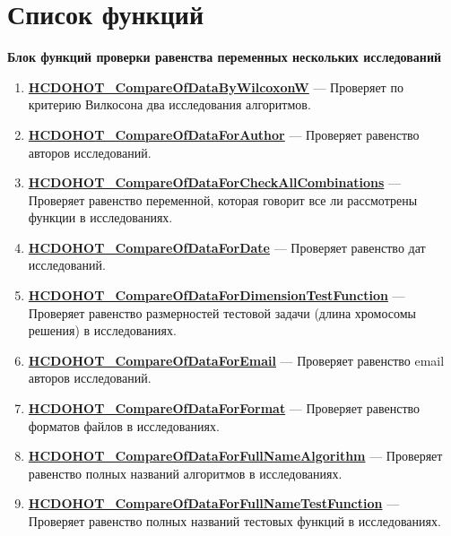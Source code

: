 \documentclass[a4paper,12pt]{article}
\begin{document}
\section{Список функций}\label{section_listfunctions}
\textbf{Блок функций проверки равенства переменных нескольких исследований}
\begin{enumerate}

\item \textbf{\hyperref[HCDOHOT_CompareOfDataByWilcoxonW]{HCDOHOT\_CompareOfDataByWilcoxonW}} --- Проверяет по критерию Вилкосона два исследования алгоритмов.

\item \textbf{\hyperref[HCDOHOT_CompareOfDataForAuthor]{HCDOHOT\_CompareOfDataForAuthor}} --- Проверяет равенство авторов исследований.

\item \textbf{\hyperref[HCDOHOT_CompareOfDataForCheckAllCombinations]{HCDOHOT\_CompareOfDataForCheckAllCombinations}} --- Проверяет равенство переменной, которая говорит все ли рассмотрены функции в исследованиях.

\item \textbf{\hyperref[HCDOHOT_CompareOfDataForDate]{HCDOHOT\_CompareOfDataForDate}} --- Проверяет равенство дат исследований.

\item \textbf{\hyperref[HCDOHOT_CompareOfDataForDimensionTestFunction]{HCDOHOT\_CompareOfDataForDimensionTestFunction}} --- Проверяет равенство размерностей тестовой задачи (длина хромосомы решения) в исследованиях.

\item \textbf{\hyperref[HCDOHOT_CompareOfDataForEmail]{HCDOHOT\_CompareOfDataForEmail}} --- Проверяет равенство email авторов исследований.

\item \textbf{\hyperref[HCDOHOT_CompareOfDataForFormat]{HCDOHOT\_CompareOfDataForFormat}} --- Проверяет равенство форматов файлов в исследованиях.

\item \textbf{\hyperref[HCDOHOT_CompareOfDataForFullNameAlgorithm]{HCDOHOT\_CompareOfDataForFullNameAlgorithm}} --- Проверяет равенство полных названий алгоритмов в исследованиях.

\item \textbf{\hyperref[HCDOHOT_CompareOfDataForFullNameTestFunction]{HCDOHOT\_CompareOfDataForFullNameTestFunction}} --- Проверяет равенство полных названий тестовых функций в исследованиях.


\end{enumerate}
\end{document}
